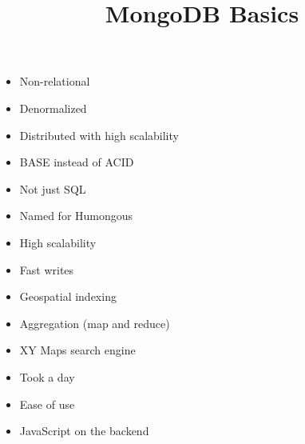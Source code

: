 \documentclass{beamer}
\title{MongoDB Basics}
\date{}%
\begin{document}
\begin{slide}%
\end{slide}


\begin{slide}%

\begin{itemize}
\item Non-relational
\item Denormalized
\item Distributed with high scalability
\item BASE instead of ACID %
\item Not just SQL
\end{itemize}

\end{slide}


\begin{slide}%

\begin{itemize}
\item Named for Humongous
\item High scalability
\item Fast writes
\item Geospatial indexing
\item Aggregation (map and reduce)
\end{itemize}

\end{slide}




\begin{slide}%

\begin{itemize}
\item XY Maps search engine
\item Took a day
\end{itemize}


\end{slide}


\begin{slide}%

\begin{itemize}
\item Ease of use
\item JavaScript on the backend
\end{itemize}

\end{slide}
\end{document}
